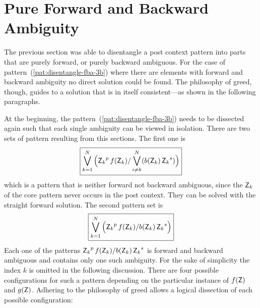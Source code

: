 \documentclass[acmtoplas]{acmtrans2m}
\newcommand{\patternref}[1]{pattern~(\ref{pat:#1})}
\newcommand{\pZk}{$\mbox{\sf Z}_k$}
\newcommand{\mpZ}{\mbox{\sf Z}}
\newcommand{\corepatternf}[1]{\mbox{\sf #1}^p  \,f(\mbox{\sf #1})}
\newcommand{\postcontextb}[1]{b(\mbox{\sf #1}) \,  \mbox{\sf #1}^s}
\begin{document}
\section{Pure Forward and Backward Ambiguity}
\label{sec:pure-forward-and-backward-ambiguity}

The previous section was able to disentangle a post context pattern into parts
that are purely forward, or purely backward ambiguous. For the case of
\patternref{disentangle-fba-3b} where there are elements with forward and
backward ambiguity no direct solution could be found. The philosophy of greed,
though, guides to a solution that is in itself
consistent---as shown in the following paragraphs.

At the beginning, the \patternref{disentangle-fba-3b} needs to be
dissected again such that each single ambiguity can be viewed in isolation.
There are two sets of pattern resulting from this sections. The first one is
\begin{equation} \label{eq:fba-pure-i-neq-k}
    \fbox{$\displaystyle 
    \bigvee_{k=1}^N 
        \Big ( 
              \corepatternf{\pZk} / \bigvee_{i\neq k}^N( \postcontextb{\pZk} )
        \Big )
    $}
\end{equation}
which is a pattern that is neither forward not backward ambiguous, since
the $\mpZ_k$ of the core pattern never occurs in the post context. They
can be solved with the straight forward solution. The second
pattern set is
\begin{equation}\label{eq:fba-pure-i-eq-k}
    \fbox{$\displaystyle 
    \bigvee_{k=1}^N 
        \Big ( 
              \corepatternf{\pZk} / \postcontextb{\pZk}  
        \Big )
    $}
\end{equation}
Each one of the patterns $\corepatternf{\pZk} / \postcontextb{\pZk}$ is forward
and backward ambiguous and contains only one such ambiguity.
For the sake of simplicity the index $k$ is omitted in the following discussion.
There are four possible configurations for such a pattern depending on the 
particular instance of $f(\mpZ)$ and $g(\mpZ)$. Adhering to the philosophy of greed allows a logical
dissection of each possible configuration:
\end{document}
